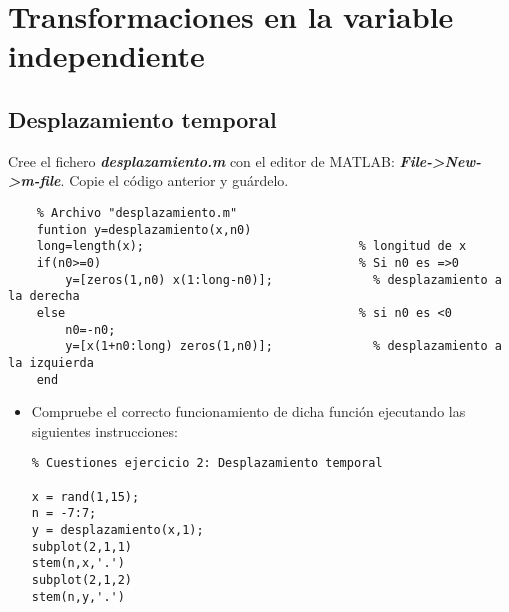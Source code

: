 \documentclass{article}
\begin{document}
\section{Transformaciones en la variable independiente}
\subsection{Desplazamiento temporal}

Cree el fichero \textbf{\textit{desplazamiento.m}} con el editor de MATLAB: \textbf{\textit{File->New->m-file}}. Copie el código anterior y guárdelo.

\begin{lstlisting}
	% Archivo "desplazamiento.m"
	funtion y=desplazamiento(x,n0)
	long=length(x);                              % longitud de x
	if(n0>=0)                                    % Si n0 es =>0
		y=[zeros(1,n0) x(1:long-n0)];              % desplazamiento a la derecha
	else                                         % si n0 es <0
		n0=-n0;
		y=[x(1+n0:long) zeros(1,n0)];              % desplazamiento a la izquierda
	end
\end{lstlisting}
\begin{itemize}[label=$-$]
	\item Compruebe el correcto funcionamiento de dicha función ejecutando las siguientes instrucciones:
	
	\begin{lstlisting}
% Cuestiones ejercicio 2: Desplazamiento temporal

x = rand(1,15);
n = -7:7;
y = desplazamiento(x,1);
subplot(2,1,1)
stem(n,x,'.')
subplot(2,1,2)
stem(n,y,'.')
	\end{lstlisting}
\end{itemize}
\end{document}
